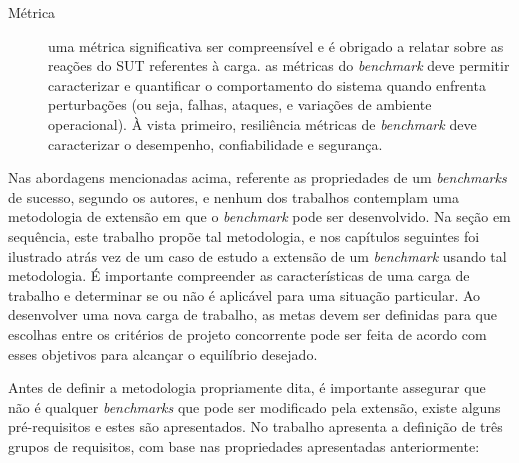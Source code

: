 \begin{description}
	\item[Métrica] uma métrica significativa ser compreensível e é obrigado a relatar sobre as reações do SUT referentes à carga. \cite{Folkerts2013} as métricas do \textit{benchmark} deve permitir caracterizar e quantificar o comportamento do sistema quando enfrenta perturbações (ou seja, falhas, ataques, e variações de ambiente operacional). À vista primeiro, resiliência métricas de \textit{benchmark} deve caracterizar o desempenho, confiabilidade e segurança.\cite{Marco2012}
	
\end{description}

Nas abordagens mencionadas acima, referente as propriedades de um \textit{benchmarks} de sucesso, segundo os autores, e nenhum dos trabalhos contemplam uma metodologia de extensão em que o \textit{benchmark} pode ser desenvolvido. Na seção em sequência, este trabalho propõe tal metodologia, e nos capítulos seguintes foi ilustrado atrás vez de um caso de estudo a extensão de um \textit{benchmark} usando tal metodologia. É importante compreender as características de uma carga de trabalho e determinar se ou não é aplicável para uma situação particular. Ao desenvolver uma nova carga de trabalho, as metas devem ser definidas para que escolhas entre os critérios de projeto concorrente pode ser feita de acordo com esses objetivos para alcançar o equilíbrio desejado. \cite{Kistowski2015}

Antes de definir a metodologia propriamente dita, é importante assegurar que não é qualquer \textit{benchmarks} que pode ser modificado pela extensão, existe alguns pré-requisitos e estes são apresentados. No trabalho \cite{Folkerts2013} apresenta a definição de três grupos de requisitos, com base nas propriedades apresentadas anteriormente:

